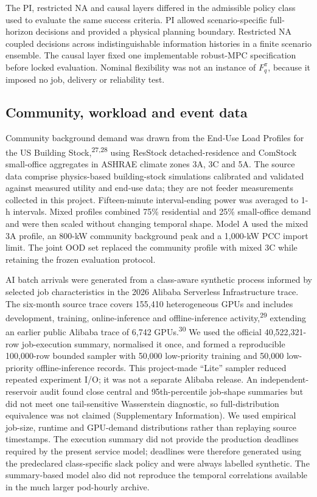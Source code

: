 \documentclass[10pt,a4paper]{article}
\begin{document}
The PI, restricted NA and causal layers differed in the admissible policy class used to evaluate the same success criteria. PI allowed scenario-specific full-horizon decisions and provided a physical planning boundary. Restricted NA coupled decisions across indistinguishable information histories in a finite scenario ensemble. The causal layer fixed one implementable robust-MPC specification before locked evaluation. Nominal flexibility was not an instance of \(F_q^{\pi}\), because it imposed no job, delivery or reliability test.


\subsection*{Community, workload and event data}

Community background demand was drawn from the End-Use Load Profiles for the US Building Stock,\textsuperscript{27,28} using ResStock detached-residence and ComStock small-office aggregates in ASHRAE climate zones 3A, 3C and 5A. The source data comprise physics-based building-stock simulations calibrated and validated against measured utility and end-use data; they are not feeder measurements collected in this project. Fifteen-minute interval-ending power was averaged to 1-h intervals. Mixed profiles combined 75\% residential and 25\% small-office demand and were then scaled without changing temporal shape. Model A used the mixed 3A profile, an 800-kW community background peak and a 1,000-kW PCC import limit. The joint OOD set replaced the community profile with mixed 3C while retaining the frozen evaluation protocol.


AI batch arrivals were generated from a class-aware synthetic process informed by selected job characteristics in the 2026 Alibaba Serverless Infrastructure trace. The six-month source trace covers 155,410 heterogeneous GPUs and includes development, training, online-inference and offline-inference activity,\textsuperscript{29} extending an earlier public Alibaba trace of 6,742 GPUs.\textsuperscript{30} We used the official 40,522,321-row job-execution summary, normalised it once, and formed a reproducible 100,000-row bounded sampler with 50,000 low-priority training and 50,000 low-priority offline-inference records. This project-made “Lite” sampler reduced repeated experiment I/O; it was not a separate Alibaba release. An independent-reservoir audit found close central and 95th-percentile job-shape summaries but did not meet one tail-sensitive Wasserstein diagnostic, so full-distribution equivalence was not claimed (Supplementary Information). We used empirical job-size, runtime and GPU-demand distributions rather than replaying source timestamps. The execution summary did not provide the production deadlines required by the present service model; deadlines were therefore generated using the predeclared class-specific slack policy and were always labelled synthetic. The summary-based model also did not reproduce the temporal correlations available in the much larger pod-hourly archive.
\end{document}
